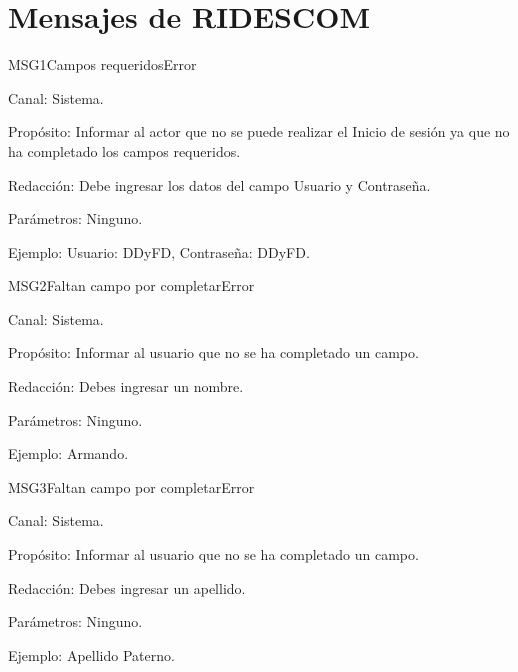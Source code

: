\section{Mensajes de RIDESCOM}


\begin{mensaje}{MSG1}{Campos requeridos}{Error}
	\item[Canal:] Sistema.
    \item[Propósito:] Informar al actor que no se puede realizar el Inicio de sesión ya que no ha completado los campos requeridos.
    \item[Redacción:] Debe ingresar los datos del campo Usuario y Contraseña.
    \item[Parámetros:] Ninguno.
    \item[Ejemplo:] Usuario: DDyFD, Contraseña: DDyFD.
\end{mensaje}
\newline


\begin{mensaje}{MSG2}{Faltan campo por completar}{Error}
	\item[Canal:] Sistema.
	\item[Propósito:] Informar al usuario que no se ha completado un campo.
	\item[Redacción:] Debes ingresar un nombre.
	\item[Parámetros:] Ninguno.
	\item[Ejemplo:] Armando.
\end{mensaje}
\newline



\begin{mensaje}{MSG3}{Faltan campo por completar}{Error}
	\item[Canal:] Sistema.
	\item[Propósito:] Informar al usuario que no se ha completado un campo.
	\item[Redacción:] Debes ingresar un apellido.
	\item[Parámetros:] Ninguno.
	\item[Ejemplo:] Apellido Paterno.
\end{mensaje}
\newline


